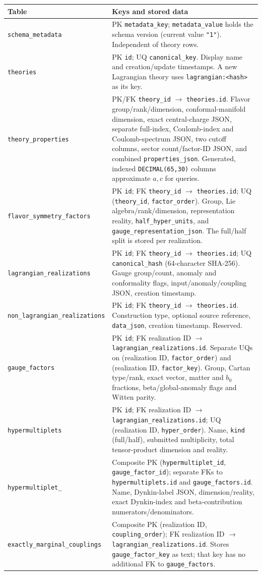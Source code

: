 \documentclass[11pt,a4paper]{article}
\renewcommand{\arraystretch}{1.2}
\numberwithin{equation}{section}
\newcommand{\code}[1]{{\small\nolinkurl{#1}}}
\begin{document}
{\small
\renewcommand{\arraystretch}{1.17}
\begin{tabularx}{\textwidth}{@{}p{53mm}Y@{}}
\toprule Table & Keys and stored data\\\midrule
\code{schema_metadata} &
PK \code{metadata_key}; \code{metadata_value} holds the schema version
(current value \code{"1"}). Independent of theory rows.\\[3pt]
\code{theories} &
PK \code{id}; UQ \code{canonical_key}. Display name and creation/update
timestamps. A new Lagrangian theory uses \code{lagrangian:<hash>} as its key.\\[3pt]
\code{theory_properties} &
PK/FK \code{theory_id} $\to$ \code{theories.id}. Flavor group/rank/dimension,
conformal-manifold dimension, exact central-charge JSON, separate full-index,
Coulomb-index and Coulomb-spectrum JSON, two cutoff columns, sector count/factor-ID JSON, and combined \code{properties_json}.
Generated, indexed \code{DECIMAL(65,30)} columns approximate $a,c$ for queries.\\[3pt]
\code{flavor_symmetry_factors} &
PK \code{id}; FK \code{theory_id} $\to$ \code{theories.id};
UQ (\code{theory_id}, \code{factor_order}). Group, Lie algebra/rank/dimension,
representation reality, \code{half_hyper_units}, and
\code{gauge_representation_json}. The full/half split is stored per realization.\\[3pt]
\code{lagrangian_realizations} &
PK \code{id}; FK \code{theory_id} $\to$ \code{theories.id};
UQ \code{canonical_hash} (64-character SHA-256). Gauge group/count, anomaly and
conformality flags, input/anomaly/coupling JSON, creation timestamp.\\[3pt]
\code{non_lagrangian_realizations} &
PK \code{id}; FK \code{theory_id} $\to$ \code{theories.id}. Construction type,
optional source reference, \code{data_json}, creation timestamp. Reserved.\\[3pt]
\code{gauge_factors} &
PK \code{id}; FK realization ID $\to$ \code{lagrangian_realizations.id}.
Separate UQs on (realization ID, \code{factor_order}) and
(realization ID, \code{factor_key}). Group, Cartan type/rank, exact vector,
matter and $b_0$ fractions, beta/global-anomaly flags and Witten parity.\\[3pt]
\code{hypermultiplets} &
PK \code{id}; FK realization ID $\to$ \code{lagrangian_realizations.id};
UQ (realization ID, \code{hyper_order}). Name, \code{kind} (full/half),
submitted multiplicity, total tensor-product dimension and reality.\\[3pt]
\code{hypermultiplet_}\newline\code{representations} &
Composite PK (\code{hypermultiplet_id}, \code{gauge_factor_id}); separate
FKs to \code{hypermultiplets.id} and \code{gauge_factors.id}. Name,
Dynkin-label JSON, dimension/reality, exact Dynkin-index and beta-contribution
numerators/denominators.\\[3pt]
\code{exactly_marginal_couplings} &
Composite PK (realization ID, \code{coupling_order}); FK realization ID
$\to$ \code{lagrangian_realizations.id}. Stores \code{gauge_factor_key}
as text; that key has no additional FK to \code{gauge_factors}.\\\bottomrule
\end{tabularx}}
\end{document}
